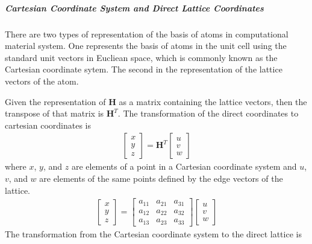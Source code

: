\documentclass[letterpaper,10pt,english]{sphinxmanual}
\begin{document}
\subparagraph{Cartesian Coordinate System and Direct Lattice Coordinates}
\label{\detokenize{crystallography/perfect_crystal:cartesian-coordinate-system-and-direct-lattice-coordinates}}
There are two types of representation of the basis of atoms in computational material system.  One represents the basis of atoms in the unit cell using the standard unit vectors in Eucliean space, which is commonly known as the Cartesian coordinate sytem.  The second in the representation of the lattice vectors of the atom.

Given the representation of \(\mathbf{H}\) as a matrix containing the lattice vectors, then the transpose of that matrix is \(\mathbf{H}^T\).  The transformation of the direct coordinates to cartesian coordinates is
\begin{equation*}
\begin{split}\begin{bmatrix} x \\ y \\ z \end{bmatrix} = \mathbf{H}^T \begin{bmatrix} u \\ v \\ w \end{bmatrix}\end{split}
\end{equation*}
where \(x\), \(y\), and \(z\) are elements of a point in a Cartesian coordinate system and \(u\), \(v\), and \(w\) are elements of the same points defined by the edge vectors of the lattice.
\begin{equation*}
\begin{split}\begin{bmatrix}
     x\\ y \\ z
\end{bmatrix}
=
\begin{bmatrix}
    a_{11} & a_{21} & a_{31} \\
    a_{12} & a_{22} & a_{32} \\
    a_{13} & a_{23} & a_{33}
\end{bmatrix}
\begin{bmatrix}
    u \\ v \\ w
\end{bmatrix}\end{split}
\end{equation*}
The transformation from the Cartesian coordinate system to the direct lattice is
\end{document}
